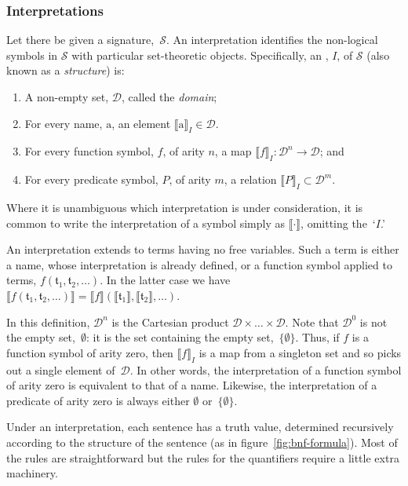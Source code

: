 \documentclass{article}
\newcommand{\nm}[1]{\mathrm{#1}} %
\newcommand{\term}[1]{\mathfrak{#1}} %
\newcommand{\interp}[1]{\lBrack#1\rBrack}
\begin{document}
\subsubsection{Interpretations}
Let there be given a signature,~$\mathcal{S}$. An interpretation identifies the
non-logical symbols in $\mathcal{S}$ with particular set-theoretic
objects. Specifically, an , $I$, of $\mathcal{S}$ (also known
as a \emph{structure}) is:
\begin{enumerate}
\item A non-empty set, $\mathcal{D}$, called the \emph{domain};
\item For every name, $\nm{a}$, an element $\lBrack \nm{a}\rBrack_I\in \mathcal{D}$. 
\item For every function symbol, $f$, of arity $n$, a map $\lBrack f \rBrack_I \colon \mathcal{D}^n\to\mathcal{D}$; and
\item For every predicate symbol, $P$, of arity $m$, a relation $\lBrack P\rBrack_I\subset \mathcal{D}^m$. 
\end{enumerate}
Where it is unambiguous which interpretation is under consideration, it
is common to write the interpretation of a symbol simply as
$\lBrack\cdot\rBrack$, omitting the~`$I$.' 

An interpretation extends to terms having no free variables. Such a term
is either a name, whose interpretation is already defined, or a function
symbol applied to terms, $f(\term{t}_1,\term{t}_2,\dots)$. In the latter
case we have
$\interp{f(\term{t}_1, \term{t}_2,
  \dots)}=\interp{f}(\interp{\term{t}_1}, \interp{\term{t}_2},\dots)$.

In this definition, $\mathcal{D}^n$ is the Cartesian product
$\mathcal{D}\times\dots\times\mathcal{D}$. Note that $\mathcal{D}^0$ is not the empty
set,~$\emptyset$: it is the set containing the empty
set,~$\{\emptyset\}$. Thus, if $f$ is a function symbol of arity zero, then
$\lBrack f\rBrack_I$ is a map from a singleton set and so picks out a
single element of~$\mathcal{D}$. In other words, the interpretation of a function
symbol of arity zero is equivalent to that of a name.  Likewise, the
interpretation of a predicate of arity zero is always either $\emptyset$
or~$\{\emptyset\}$.

Under an interpretation, each sentence has a truth value, determined
recursively according to the structure of the sentence (as in
figure~\ref{fig:bnf-formula}).  Most of the rules are straightforward
but the rules for the quantifiers require a little extra machinery.
\end{document}
